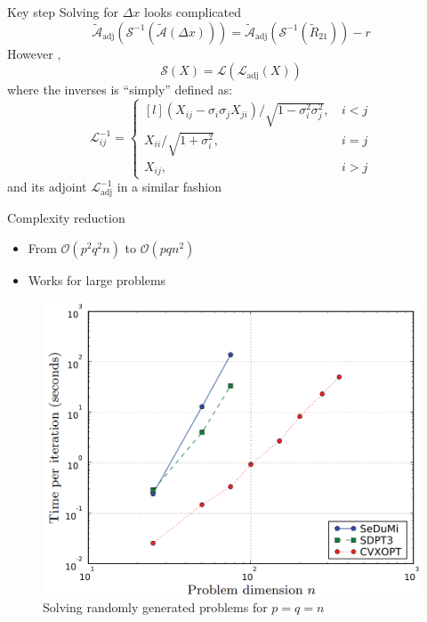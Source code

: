 \documentclass{beamer}
\newcommand{\mA}{\mathcal{A}}
\begin{document}
\begin{frame}{Key step}
Solving for $ \Delta x $ looks complicated
	\begin{equation}
		\tilde{\mA}_\text{adj}(\mathcal{S}^{-1}(\tilde{\mA}(\Delta x)))=\tilde{\mA}_\text{adj}(\mathcal{S}^{-1}(\tilde{R}_{21})) -r
	\end{equation}
However ,
\begin{equation}
	\mathcal{S}(X) = \mathcal{L}(\mathcal{L}_\text{adj}(X))
\end{equation}
where the inverses is ``simply'' defined as:
\begin{equation}
	\mathcal{L}^{-1}_{ij} = 
	\left\{\begin{matrix*}[l]
		(X_{ij} - \sigma_i\sigma_jX_{ji})/\sqrt{1-\sigma_i^2\sigma_j^2},\, &i<j\\
		X_{ii}/\sqrt{1+\sigma_i^2},\,&i=j\\
		X_{ij},\,&i>j
	\end{matrix*}\right.
\end{equation}
and its adjoint $ \mathcal{L}_\text{adj}^{-1} $ in a similar fashion
\end{frame}
\begin{frame}{Complexity reduction}
	\begin{itemize}
		\item From $ \mathcal{O}(p^2q^2n) $ to $ \mathcal{O}(pqn^2) $
		\item Works for large problems
	\end{itemize}
	 \begin{figure}[h]
		\includegraphics[width=0.55\linewidth]{Fig_1}
		\caption{Solving randomly generated problems for $p=q=n $}
		\label{}
	\end{figure}
\end{frame}
\end{document}
